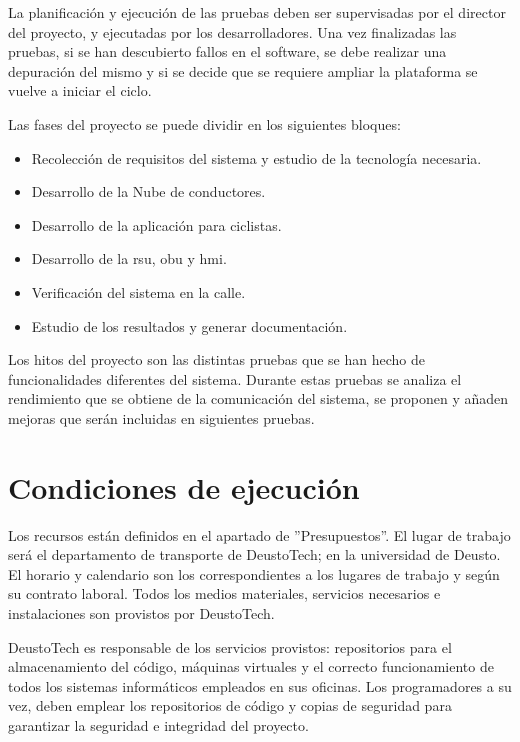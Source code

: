 La planificación y ejecución de las pruebas deben ser supervisadas por el director del proyecto, y ejecutadas por los desarrolladores. Una vez finalizadas las pruebas, si se han descubierto fallos en el software, se debe realizar una depuración del mismo y si se decide que se requiere ampliar la plataforma se vuelve a iniciar el ciclo.

Las fases del proyecto se puede dividir en los siguientes bloques:
\begin{itemize}
	\item Recolección de requisitos del sistema y estudio de la tecnología necesaria.
	
	\item Desarrollo de la Nube de conductores.
	
	\item Desarrollo de la aplicación para ciclistas.
	
	\item Desarrollo de la \gls{rsu}, \gls{obu} y \gls{hmi}.
	
	\item Verificación del sistema en la calle.
	
	\item Estudio de los resultados y generar documentación.
\end{itemize}

Los hitos del proyecto son las distintas pruebas que se han hecho de funcionalidades
diferentes del sistema. Durante estas pruebas se analiza el rendimiento que se obtiene
de la comunicación del sistema, se proponen y añaden mejoras que serán incluidas en
siguientes pruebas.
\section{Condiciones de ejecución}
Los recursos están definidos en el apartado de ''Presupuestos''. El lugar de trabajo será el departamento de transporte de DeustoTech; en la universidad de Deusto. El horario y calendario son los correspondientes a los lugares de trabajo y según su contrato laboral. Todos los medios materiales, servicios necesarios e instalaciones son provistos por DeustoTech.

DeustoTech es responsable de los servicios provistos: repositorios para el almacenamiento del código, máquinas virtuales y el correcto funcionamiento de todos los sistemas informáticos empleados en sus oficinas. Los programadores a su vez, deben emplear los repositorios de código y copias de seguridad para garantizar la seguridad e integridad del proyecto.

